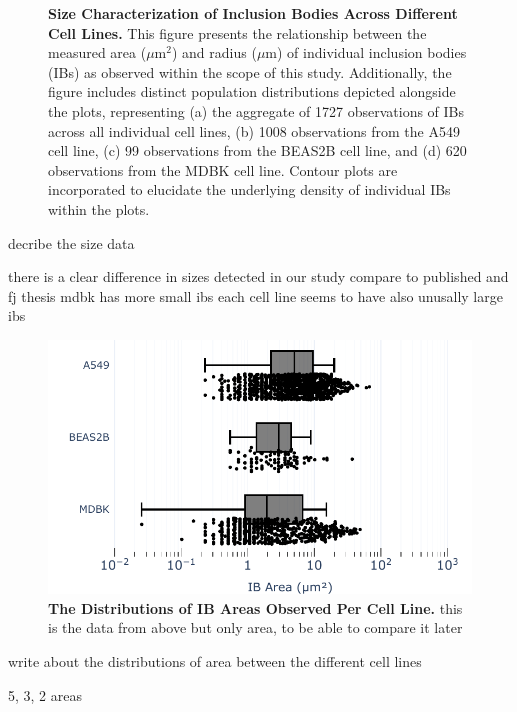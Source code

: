 \begin{figure}
    \caption[Size Characterization of Inclusion Bodies Across Different Cell Lines.]{\textbf{Size Characterization of Inclusion Bodies Across Different Cell Lines.} This figure presents the relationship between the measured area (\(\mu \mbox{m}^2\)) and radius (\(\mu \mbox{m}\)) of individual inclusion bodies (IBs) as observed within the scope of this study. Additionally, the figure includes distinct population distributions depicted alongside the plots, representing (a) the aggregate of 1727 observations of IBs across all individual cell lines, (b) 1008 observations from the A549 cell line, (c) 99 observations from the BEAS2B cell line, and (d) 620 observations from the MDBK cell line. Contour plots are incorporated to elucidate the underlying density of individual IBs within the plots.}
    \label{fig:Size Characterization of Inclusion Bodies Across Different Cell Lines}  
\end{figure}

decribe the size data

there is a clear difference in sizes detected in our study
compare to published and fj thesis
mdbk has more small ibs
each cell line seems to have also unusally large ibs


\begin{figure}
    \centering
    \includegraphics[width=1\linewidth]{08. Chapter 3/Figs/01. Localisation introduction/06. box-infection.pdf}
    \caption[The Distributions of IB Areas Observed Per Cell Line.]{\textbf{The Distributions of IB Areas Observed Per Cell Line.} this is the data from above but only area, to be able to compare it later}
    \label{fig:The Distributions of IB Areas Observed Per Cell Line}
\end{figure}

write about the distributions of area between the different cell lines

5, 3, 2 areas